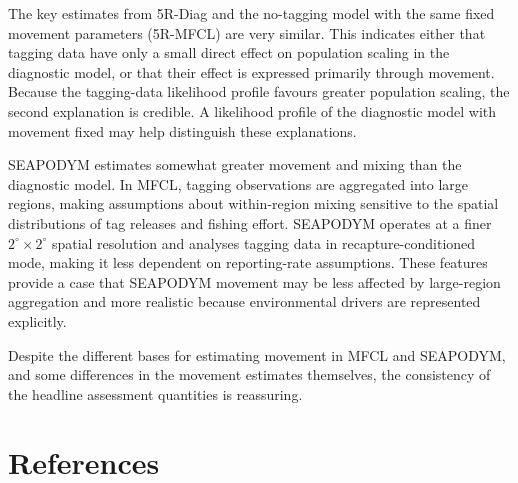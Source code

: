 \documentclass[
  english,
  a4paper,
  a4paper,
  11pt]{SCreport}
\begin{document}
The key estimates from 5R-Diag and the no-tagging model with the same
fixed movement parameters (5R-MFCL) are very similar. This indicates
either that tagging data have only a small direct effect on population
scaling in the diagnostic model, or that their effect is expressed
primarily through movement. Because the tagging-data likelihood profile
favours greater population scaling, the second explanation is credible.
A likelihood profile of the diagnostic model with movement fixed may
help distinguish these explanations.

SEAPODYM estimates somewhat greater movement and mixing than the
diagnostic model. In MFCL, tagging observations are aggregated into
large regions, making assumptions about within-region mixing sensitive
to the spatial distributions of tag releases and fishing effort.
SEAPODYM operates at a finer \(2^\circ \times 2^\circ\) spatial
resolution and analyses tagging data in recapture-conditioned mode,
making it less dependent on reporting-rate assumptions. These features
provide a case that SEAPODYM movement may be less affected by
large-region aggregation and more realistic because environmental
drivers are represented explicitly.

Despite the different bases for estimating movement in MFCL and
SEAPODYM, and some differences in the movement estimates themselves, the
consistency of the headline assessment quantities is reassuring.

\section*{References}\label{references}
\end{document}
